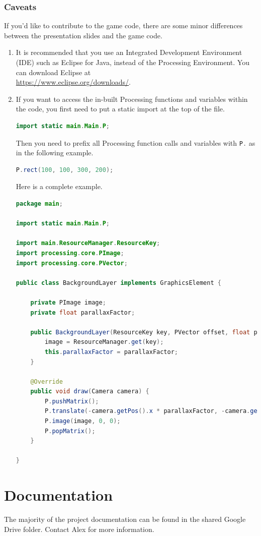 \documentclass[11pt]{article}
\begin{document}
\subsubsection{Caveats}
If you'd like to contribute to the game code, there are some minor differences between the presentation slides and the game code.
\begin{enumerate}
\item It is recommended that you use an Integrated Development Environment (IDE) such as Eclipse for Java, instead of the Processing Environment. You can download Eclipse at\\ \url{https://www.eclipse.org/downloads/}.
\item If you want to access the in-built Processing functions and variables within the code, you first need to put a static import at the top of the file.
\begin{lstlisting}[language=Java]
import static main.Main.P;
\end{lstlisting}
Then you need to prefix all Processing function calls and variables with \lstinline[language=Java]{P.} as in the following example.
\begin{lstlisting}[language=Java]
P.rect(100, 100, 300, 200);
\end{lstlisting}
Here is a complete example.
\begin{lstlisting}[language=Java]
package main;

import static main.Main.P;

import main.ResourceManager.ResourceKey;
import processing.core.PImage;
import processing.core.PVector;

public class BackgroundLayer implements GraphicsElement {

	private PImage image;
	private float parallaxFactor;

	public BackgroundLayer(ResourceKey key, PVector offset, float parallaxFactor) {
		image = ResourceManager.get(key);
		this.parallaxFactor = parallaxFactor;
	}

	@Override
	public void draw(Camera camera) {
		P.pushMatrix();
		P.translate(-camera.getPos().x * parallaxFactor, -camera.getPos().y);
		P.image(image, 0, 0);
		P.popMatrix();
	}

}
\end{lstlisting}
\end{enumerate}
\section{Documentation}
The majority of the project documentation can be found in the shared Google Drive folder. Contact Alex for more information.
\end{document}
